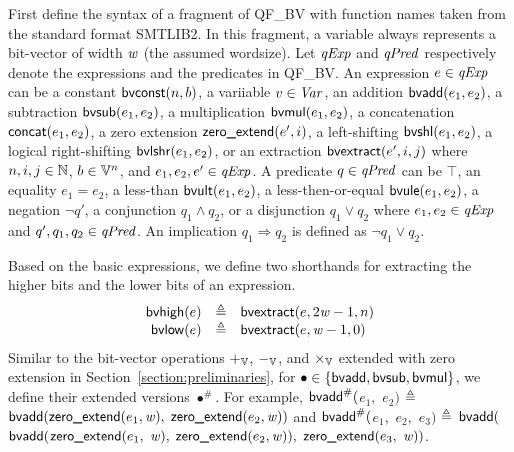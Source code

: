 
First define the syntax of a fragment of QF\_BV with function names taken from the standard format SMTLIB2.
In this fragment, a variable always represents a bit-vector of width $\mathit{w}$ (the assumed wordsize).
Let $\mathit{qExp}$ and $\mathit{qPred}$ respectively denote the expressions and the predicates in QF\_BV.
An expression $e \in \mathit{qExp}$ can be a constant $\mbox{\textsf{bvconst}}(n, b)$, a variiable $v \in \mathit{Var}$, an addition $\mbox{\textsf{bvadd}}(e_1, e_2)$, a subtraction $\mbox{\textsf{bvsub}}(e_1, e_2)$, a multiplication $\mbox{\textsf{bvmul}}(e_1, e_2)$, a concatenation $\mbox{\textsf{concat}}(e_1, e_2)$, a zero extension $\mbox{\textsf{zero\_extend}}(e', i)$, a left-shifting $\mbox{\textsf{bvshl}}(e_1, e_2)$, a logical right-shifting $\mbox{\textsf{bvlshr}}(e_1, e_2)$, or an extraction $\mbox{\textsf{bvextract}}(e', i, j)$ where $n, i, j \in \mathbb{N}$, $b \in \mathbb{V}^n$, and $e_1, e_2, e' \in \mathit{qExp}$.
A predicate $q \in \mathit{qPred}$ can be $\top$, an equality $e_1 = e_2$, a less-than $\mbox{\textsf{bvult}}(e_1, e_2)$, a less-then-or-equal $\mbox{\textsf{bvule}}(e_1, e_2)$, a negation $\neg q'$, a conjunction $q_1 \wedge q_2$, or a disjunction $q_1 \vee q_2$ where $e_1, e_2 \in \mathit{qExp}$ and $q', q_1, q_2 \in \mathit{qPred}$.
An implication $q_1 \Rightarrow q_2$ is defined as $\neg q_1 \vee q_2$.

Based on the basic expressions, we define two shorthands for extracting the higher bits and the lower bits of an expression.
\[
\begin{array}{rcl}
\mbox{\textsf{bvhigh}}(e) & \triangleq & \mbox{\textsf{bvextract}}(e, 2\mathit{w} - 1, n) \\
\mbox{\textsf{bvlow}}(e) & \triangleq & \mbox{\textsf{bvextract}}(e, \mathit{w} - 1, 0) \\
\end{array}
\]
Similar to the bit-vector operations $+_{\mathbb{V}}$, $-_{\mathbb{V}}$, and $\times_{\mathbb{V}}$ extended with zero extension in Section~\ref{section:preliminaries}, for $\bullet \in \{\mbox{\textsf{bvadd}}, \mbox{\textsf{bvsub}}, \mbox{\textsf{bvmul}}\}$, we define their extended versions $\bullet^\#$.
For example, $\mbox{\textsf{bvadd}}^{\#}($$e_1,$ $e_2)$ $\triangleq$ $\mbox{\textsf{bvadd}}(\mbox{\textsf{zero\_extend}}(e_1, \mathit{w}),$ $\mbox{\textsf{zero\_extend}}(e_2, \mathit{w}))$ and $\mbox{\textsf{bvadd}}^{\#}($$e_1,$ $e_2,$ $e_3)$ $\triangleq$ $\mbox{\textsf{bvadd}}($$\mbox{\textsf{bvadd}}($$\mbox{\textsf{zero\_extend}}(e_1,$ $\mathit{w}),$ $\mbox{\textsf{zero\_extend}}(e_2, \mathit{w})),$ $\mbox{\textsf{zero\_extend}}(e_3,$ $\mathit{w}))$.

